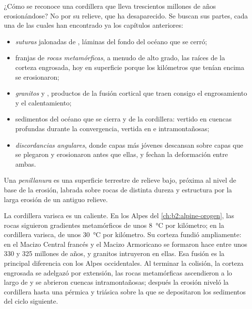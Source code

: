 ¿Cómo se reconoce una cordillera que lleva trescientos millones de años erosionándose?
No por su relieve, que ha desaparecido. Se buscan sus partes, cada una de las cuales han encontrado ya los capítulos
anteriores:
\begin{itemize}
\item \emph{suturas} jalonadas de \emph{}, láminas del fondo del océano que se cerró;
\item franjas de \emph{rocas metamórficas}, a menudo de alto grado, las raíces de la corteza engrosada,
hoy en superficie porque los kilómetros que tenían encima se erosionaron;
\item \emph{granitos} y \emph{}, productos de la fusión cortical que traen consigo
el engrosamiento y el calentamiento;
\item sedimentos del océano que se cierra y de la cordillera: \emph{} vertido en cuencas profundas
durante la convergencia, \emph{} vertida en  e intramontañosas;
\item \emph{discordancias angulares}, donde capas más jóvenes descansan sobre capas que se plegaron y
erosionaron antes que ellas, y fechan la deformación entre ambas.
\end{itemize}

\begin{definition}[Penillanura]\label{def:b2:wilson-cycle:peneplain}
Una \emph{penillanura} es una superficie terrestre de relieve bajo, próxima al nivel de base de
la erosión, labrada sobre rocas de distinta dureza y estructura por la larga erosión de un antiguo
relieve.
\end{definition}

La cordillera varisca es un  caliente. En los Alpes del \cref{ch:b2:alpine-orogen}, las rocas
siguieron gradientes metamórficos de unos \qty{8}{\celsius} por kilómetro; en la cordillera varisca,
de unos \qty{30}{\celsius} por kilómetro. Su corteza fundió ampliamente: en el Macizo Central francés
y el Macizo Armoricano se formaron  hace entre unos 330 y 325 millones de años, y
granitos intruyeron en ellas. Esa fusión es la principal diferencia con los Alpes occidentales. Al terminar la
colisión, la corteza engrosada se adelgazó por extensión, las rocas metamórficas ascendieron
a lo largo de  y se abrieron cuencas intramontañosas; después la erosión niveló la cordillera hasta una
 pérmica y triásica sobre la que se depositaron los sedimentos del ciclo siguiente.

